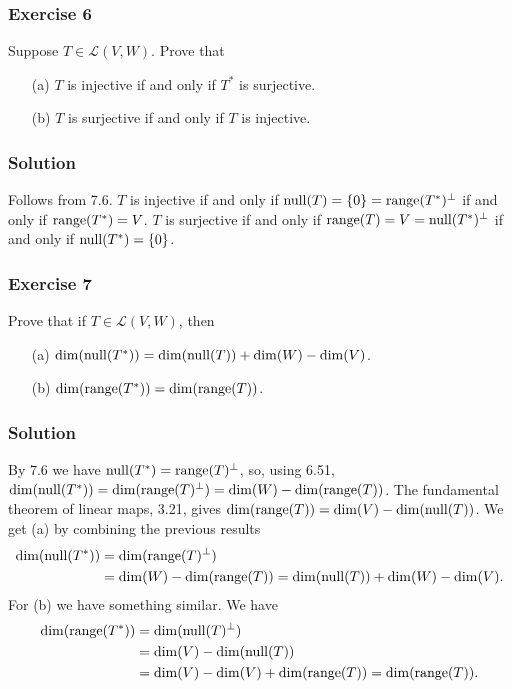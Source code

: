 \subsubsection*{Exercise 6}

Suppose $T \in \mathcal{L}(V, W)$.
Prove that
\begin{itemize}
\item[(a)] $T$ is injective if and only if $T^*$ is surjective.
\item[(b)] $T$ is surjective if and only if $T$ is injective.
\end{itemize}

\subsubsection*{Solution}

Follows from 7.6.
$T$ is injective if and only if $\mathrm{null}(T) = \{0\} = \mathrm{range}(T^*)^{\perp}$ if and only if $\mathrm{range}(T^*) = V$.
$T$ is surjective if and only if $\mathrm{range}(T) = V = \mathrm{null}(T^*)^{\perp}$ if and only if $\mathrm{null}(T^*) = \{0\}$.


\subsubsection*{Exercise 7}

Prove that if $T \in \mathcal{L}(V, W)$, then
\begin{itemize}
\item[(a)] $\dim(\mathrm{null}(T^*)) = \dim(\mathrm{null}(T)) + \dim(W) - \dim(V)$.
\item[(b)] $\dim(\mathrm{range}(T^*)) = \dim(\mathrm{range}(T))$.
\end{itemize}

\subsubsection*{Solution}

By 7.6 we have $\mathrm{null}(T^*) = \mathrm{range}(T)^{\perp}$, so, using 6.51, $\dim(\mathrm{null}(T^*)) = \dim(\mathrm{range}(T)^{\perp}) = \dim(W) - \dim(\mathrm{range}(T))$.
The fundamental theorem of linear maps, 3.21, gives $\dim(\mathrm{range}(T)) = \dim(V) - \dim(\mathrm{null}(T))$.
We get (a) by combining the previous results
\begin{equation*}
    \begin{split}
        \dim(\mathrm{null}(T^*)) &= \dim(\mathrm{range}(T)^{\perp}) \\
            &= \dim(W) - \dim(\mathrm{range}(T))
            = \dim(\mathrm{null}(T)) + \dim(W) - \dim(V).
    \end{split}
\end{equation*}
For (b) we have something similar.
We have
\begin{equation*}
    \begin{split}
        \dim(\mathrm{range}(T^*)) &= \dim(\mathrm{null}(T)^{\perp}) \\
            &= \dim(V) - \dim(\mathrm{null}(T)) \\
            &= \dim(V) - \dim(V) + \dim(\mathrm{range}(T))
            = \dim(\mathrm{range}(T)).
    \end{split}
\end{equation*}



